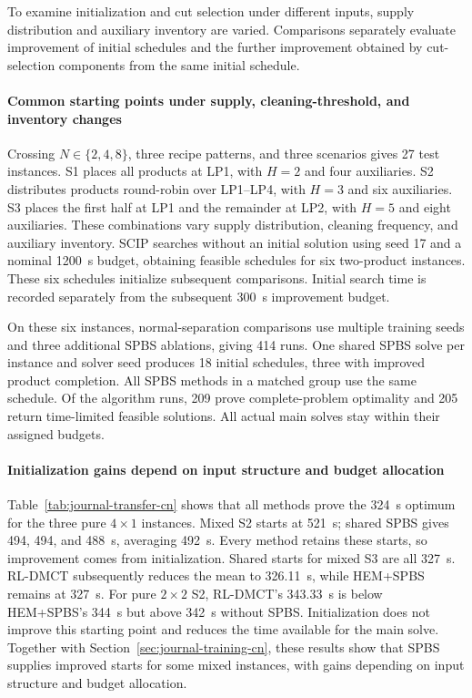 \documentclass[final,5p,times,twocolumn]{elsarticle}
\newcounter{algorithm}
\begin{document}
To examine initialization and cut selection under different inputs, supply distribution and auxiliary inventory are varied. Comparisons separately evaluate improvement of initial schedules and the further improvement obtained by cut-selection components from the same initial schedule.

\paragraph{Common starting points under supply, cleaning-threshold, and inventory changes}
Crossing $N\in\{2,4,8\}$, three recipe patterns, and three scenarios gives 27 test instances. S1 places all products at LP1, with $H=2$ and four auxiliaries. S2 distributes products round-robin over LP1--LP4, with $H=3$ and six auxiliaries. S3 places the first half at LP1 and the remainder at LP2, with $H=5$ and eight auxiliaries. These combinations vary supply distribution, cleaning frequency, and auxiliary inventory. SCIP searches without an initial solution using seed 17 and a nominal 1200~s budget, obtaining feasible schedules for six two-product instances. These six schedules initialize subsequent comparisons. Initial search time is recorded separately from the subsequent 300~s improvement budget.

On these six instances, normal-separation comparisons use multiple training seeds and three additional SPBS ablations, giving 414 runs. One shared SPBS solve per instance and solver seed produces 18 initial schedules, three with improved product completion. All SPBS methods in a matched group use the same schedule. Of the algorithm runs, 209 prove complete-problem optimality and 205 return time-limited feasible solutions. All actual main solves stay within their assigned budgets.

\paragraph{Initialization gains depend on input structure and budget allocation}
Table~\ref{tab:journal-transfer-cn} shows that all methods prove the 324~s optimum for the three pure $4\times1$ instances. Mixed S2 starts at 521~s; shared SPBS gives 494, 494, and 488~s, averaging 492~s. Every method retains these starts, so improvement comes from initialization. Shared starts for mixed S3 are all 327~s. RL-DMCT subsequently reduces the mean to 326.11~s, while HEM+SPBS remains at 327~s. For pure $2\times2$ S2, RL-DMCT's 343.33~s is below HEM+SPBS's 344~s but above 342~s without SPBS. Initialization does not improve this starting point and reduces the time available for the main solve. Together with Section~\ref{sec:journal-training-cn}, these results show that SPBS supplies improved starts for some mixed instances, with gains depending on input structure and budget allocation.
\end{document}
